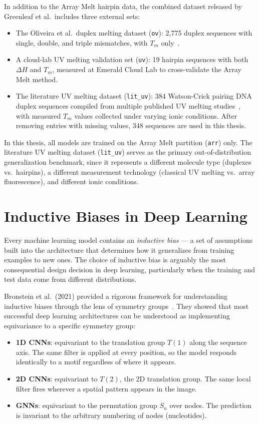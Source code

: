 \documentclass[12pt,oneside,letterpaper]{report}
\begin{document}
In addition to the Array Melt hairpin data, the combined dataset released by Greenleaf et al.\ includes three external sets:
\begin{itemize}
    \item The Oliveira et al.\ duplex melting dataset (\texttt{ov}): 2,775 duplex sequences with single, double, and triple mismatches, with $T_m$ only~\cite{oliveira2020}.
    \item A cloud-lab UV melting validation set (\texttt{uv}): 19 hairpin sequences with both $\Delta H$ and $T_m$, measured at Emerald Cloud Lab to cross-validate the Array Melt method.
    \item The literature UV melting dataset (\texttt{lit\_uv}): 384 Watson-Crick pairing DNA duplex sequences compiled from multiple published UV melting studies~\cite{greenleaf2025}, with measured $T_m$ values collected under varying ionic conditions. After removing entries with missing values, 348 sequences are used in this thesis.
\end{itemize}

In this thesis, all models are trained on the Array Melt partition (\texttt{arr}) only. The literature UV melting dataset (\texttt{lit\_uv}) serves as the primary out-of-distribution generalization benchmark, since it represents a different molecule type (duplexes vs.\ hairpins), a different measurement technology (classical UV melting vs.\ array fluorescence), and different ionic conditions.

\section{Inductive Biases in Deep Learning}

Every machine learning model contains an \textit{inductive bias} --- a set of assumptions built into the architecture that determines how it generalizes from training examples to new ones. The choice of inductive bias is arguably the most consequential design decision in deep learning, particularly when the training and test data come from different distributions.

Bronstein et al.\ (2021) provided a rigorous framework for understanding inductive biases through the lens of symmetry groups~\cite{bronstein2021}. They showed that most successful deep learning architectures can be understood as implementing equivariance to a specific symmetry group:

\begin{itemize}
    \item \textbf{1D CNNs}: equivariant to the translation group $T(1)$ along the sequence axis. The same filter is applied at every position, so the model responds identically to a motif regardless of where it appears.
    \item \textbf{2D CNNs}: equivariant to $T(2)$, the 2D translation group. The same local filter fires wherever a spatial pattern appears in the image.
    \item \textbf{GNNs}: equivariant to the permutation group $S_n$ over nodes. The prediction is invariant to the arbitrary numbering of nodes (nucleotides).
\end{itemize}
\end{document}
